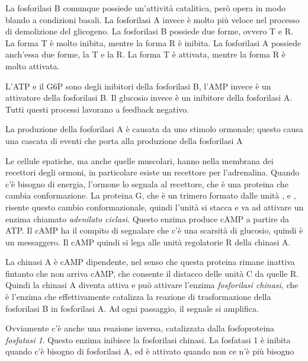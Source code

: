 
La fosforilasi B comunque possiede un'attività catalitica, però opera in modo blando a condizioni basali. La fosforilasi A invece è molto più veloce nel processo di demolizione del glicogeno. La fosforilasi B possiede due forme, ovvero T e R. La forma T è molto inibita, mentre la forma R è inibita. La fosforilasi A possiede anch'essa due forme, la T e la R. La forma T è attivata, mentre la forma R è molto attivata.

L'ATP e il G6P sono degli inibitori della fosforilasi B, l'AMP invece è un attivatore della fosforilasi B. Il glucosio invece è un inibitore della fosforilasi A. Tutti questi processi lavorano a feedback negativo.

La produzione della fosforilasi A è causata da uno stimolo ormonale; questo causa una cascata di eventi che porta alla produzione della fosforilasi A


Le cellule epatiche, ma anche quelle muscolari, hanno nella membrana dei recettori degli ormoni, in particolare esiste un recettore per l'adrenalina. Quando c'è bisogno di energia, l'ormone lo segnala al recettore, che è una proteina che cambia conformazione. La proteina G, che è un trimero formato dalle unità \alpha,\beta{} e \gamma, risente questo cambio conformazionale, quindi l'unità \alpha{} si stacca e va ad attivare un enzima chiamato \emph{adenilato ciclasi}. Questo enzima produce cAMP a partire da ATP. Il{} cAMP ha il compito di segnalare che c'è una scarsità di glucosio, quindi è un messaggero. Il cAMP quindi si lega alle unità regolatorie R della chinasi A.


La chinasi A è cAMP dipendente, nel senso che questa proteina rimane inattiva fintanto che non arriva cAMP, che consente il distacco delle unità C da quelle R. Quindi la chinasi A diventa attiva e può attivare l'enzima \emph{fosforilasi chinasi}, che è l'enzima che effettivamente catalizza la reazione di trasformazione della fosforilasi B in fosforilasi A.
Ad ogni passaggio, il segnale si amplifica.

Ovviamente c'è anche una reazione inversa, catalizzata dalla fosfoproteina \emph{fosfatasi 1}. Questo enzima inibisce la fosforilasi chinasi. La fosfatasi 1 è inibita quando c'è bisogno di fosforilasi A, ed è attivato quando non ce n'è più bisogno

